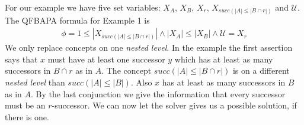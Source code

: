 \documentclass{book}
\theoremstyle{break}
\theoremstyle{definition}
\begin{document}
For our example we have five set variables: $X_A$, $X_B$, $X_r$, $X_{succ(|A|\leq |B\cap r|)}$ and $\mathcal{U}$. The QFBAPA formula for Example 1 is 
\begin{align}\label{f}
\phi=1\leq |X_{succ(|A|\leq |B\cap r|)}|\wedge |X_A|\leq |X_B|\wedge \mathcal{U}=X_r
\end{align}
We only replace concepts on one \textit{nested level}. In the example the first assertion says that $x$ must have at least one successor $y$ which has at least as many successors in $B\cap r$ as in $A$. The concept $succ(|A|\leq|B\cap r|)$ is on a different \textit{nested level} than $succ(|A|\leq |B|)$. Also $x$ has at least as many successors in $B$ as in $A$. By the last conjunction we give the information that every successor must be an $r$-successor. We can now let the solver gives us a possible solution, if there is one.
\end{document}
